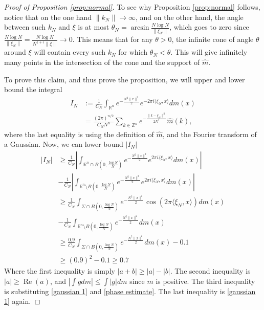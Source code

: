 \documentclass[11pt,letterpaper]{amsart}
\theoremstyle{definition}
\theoremstyle{plain}
\newcommand{\Rea}{\operatorname{Re}}
\newcommand{\R}{{\mathbb R}}
\newcommand{\Z}{{\mathbb Z}}
\begin{document}
\begin{proof}[Proof of Proposition \ref{prop:normal}]
    To see why Proposition \ref{prop:normal} follows, notice that on the one hand $\|k_{N}\|\to \infty$, and on the other hand, the angle between such $k_{N}$ and $\xi$ is at most $\theta_{N}={\arcsin}\frac{N\log N}{\|\xi_{N}\|}$, which goes to zero since $\frac{N\log N}{\|\xi_{N}\|}=\frac{N\log N}{N^{1+\epsilon}\|\xi\|}\to 0$. This means that for any $\theta>0$, the infinite cone of angle $\theta$ around $\xi$ will contain every such $k_{N}$ for which $\theta_{N}<\theta$. This will give infinitely many points in the intersection of the cone and the support of $\widehat{m}$. 



To prove this claim, and thus prove the proposition, we will upper and lower bound the integral
\begin{align*}
    I_N & :=\frac{1}{C_{N}}\int_{\R^n}e^{-\frac{N^2\|x\|^2}{2}}e^{-2\pi i \langle\xi_{N},x\rangle}dm(x)\\
    & =\frac{(2\pi)^{n/2}}{C_{N}N^{n}}\sum_{k\in\Z^n}e^{-\frac{\|k-\xi_{N}\|^2}{2N^2}}\widehat{m}(k),
\end{align*}
where the last equality is using the definition of $\widehat{m}$, and the Fourier transform of a Gaussian. Now, we can lower bound $|I_{N}|$ 
    	\begin{align*}
		|I_{N}| &  
        \ge \frac{1}{C_{N}}\left|\int_{\R^n\cap B(0,\frac{\log N}{N})}e^{-\frac{N^2\|x\|^2}{2}}e^{2\pi i \langle\xi_{N},x\rangle}dm(x)\right|\\&-\frac{1}{C_{N}}\left|\int_{\R^n\setminus B(0,\frac{\log N}{N})}e^{-\frac{N^2\|x\|^2}{2}}e^{2\pi i \langle\xi_{N},x\rangle}dm(x)\right|  \\
 &       \ge \frac{1}{C_{N}}\int_{\Sigma\cap B(0,\frac{\log N}{N})}e^{-\frac{N^2\|x\|^2}{2}}\cos(2\pi \langle\xi_{N},x\rangle)dm(x)\\ 
 &-\frac{1}{C_{N}}\int_{\R^n\setminus B(0,\frac{\log N}{N})}e^{-\frac{N^2\|x\|^2}{2}}dm(x)  \\
 &\ge \frac{0.9}{C_{N}}\int_{\Sigma\cap B(0,\frac{\log N}{N})}e^{-\frac{N^2\|x\|^2}{2}}dm(x)-0.1   \\
 &\ge (0.9)^2 -0.1 \ge 0.7  
	\end{align*}
    Where the first inequality is simply $|a+b|\ge|a|-|b|$. The second inequality is $|a|\geq\Rea(a)$, and $|\int gdm|\le \int |g|dm$ since $m$ is positive. The third inequality is substituting \eqref{gaussian 1} and \eqref{phase estimate}. The last inequality is \eqref{gaussian 1} again.  

    


\end{proof}
\end{document}
